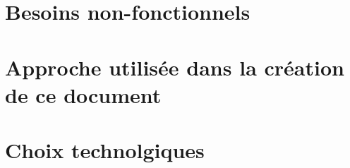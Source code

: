 \documentclass[a4paper, 11pt]{article}
\begin{document}
\section{Besoins non-fonctionnels}
\section{Approche utilisée dans la création de ce document}
\section{Choix technolgiques}
\end{document}
